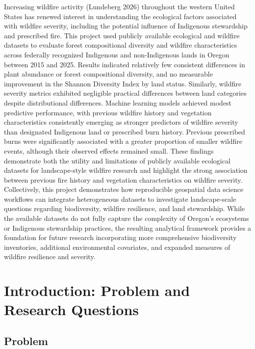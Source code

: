 \documentclass[
  letterpaper,
  DIV=11,
  numbers=noendperiod]{scrartcl}
\begin{document}
Increasing wildfire activity (Lundeberg 2026) throughout the western
United States has renewed interest in understanding the ecological
factors associated with wildfire severity, including the potential
influence of Indigenous stewardship and prescribed fire. This project
used publicly available ecological and wildfire datasets to evaluate
forest compositional diversity and wildfire characteristics across
federally recognized Indigenous and non-Indigenous lands in Oregon
between 2015 and 2025. \hspace{0pt} Results indicated relatively few
consistent differences in plant abundance or forest compositional
diversity, and no measurable improvement in the Shannon Diversity Index
by land status. Similarly, wildfire severity metrics exhibited
negligible practical differences between land categories despite
distributional differences. Machine learning models achieved modest
predictive performance, with previous wildfire history and vegetation
characteristics consistently emerging as stronger predictors of wildfire
severity than designated Indigenous land or prescribed burn history.
Previous prescribed burns were significantly associated with a greater
proportion of smaller wildfire events, although their observed effects
remained small. \hspace{0pt} These findings demonstrate both the utility
and limitations of publicly available ecological datasets for
landscape-style wildfire research and highlight the strong association
between previous fire history and vegetation characteristics on wildfire
severity. Collectively, this project demonstrates how reproducible
geospatial data science workflows can integrate heterogeneous datasets
to investigate landscape-scale questions regarding biodiversity,
wildfire resilience, and land stewardship. While the available datasets
do not fully capture the complexity of Oregon's ecosystems or Indigenous
stewardship practices, the resulting analytical framework provides a
foundation for future research incorporating more comprehensive
biodiversity inventories, additional environmental covariates, and
expanded measures of wildfire resilience and severity.

\section{Introduction: Problem and Research
Questions}\label{introduction-problem-and-research-questions}

\subsection{Problem}\label{problem}
\end{document}
